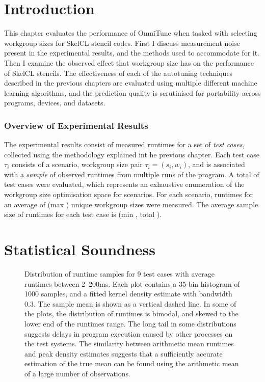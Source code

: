 \section{Introduction}

This chapter evaluates the performance of OmniTune when tasked with
selecting workgroup sizes for SkelCL stencil codes. First I discuss
measurement noise present in the experimental results, and the methods
used to accommodate for it. Then I examine the observed effect that
workgroup size has on the performance of SkelCL stencils. The
effectiveness of each of the autotuning techniques described in the
previous chapters are evaluated using multiple different machine
learning algorithms, and the prediction quality is scrutinised for
portability across programs, devices, and datasets.


\subsubsection{Overview of Experimental Results}

The experimental results consist of measured runtimes for a set of
\emph{test cases}, collected using the methodology explained int he
previous chapter. Each test case $\tau_i$ consists of a scenario,
workgroup size pair $\tau_i = (s_i,w_i)$, and is associated with a
\emph{sample} of observed runtimes from multiple runs of the
program. A total of  test cases were
evaluated, which represents an exhaustive enumeration of the workgroup
size optimisation space for  scenarios. For
each scenario, runtimes for an average of 
(max ) unique workgroup sizes were
measured. The average sample size of runtimes for each test case is
 (min , total
).


\section{Statistical Soundness}

\begin{figure}

\caption{%
  Distribution of runtime samples for 9 test cases with average
  runtimes between 2--200ms. Each plot contains a 35-bin histogram of
  1000 samples, and a fitted kernel density estimate with bandwidth
  0.3. The sample mean is shown as a vertical dashed line. In some of
  the plots, the distribution of runtimes is bimodal, and skewed to
  the lower end of the runtimes range. The long tail in some
  distributions suggests delays in program execution caused by other
  processes on the test systems. The similarity between arithmetic
  mean runtimes and peak density estimates suggests that a
  sufficiently accurate estimation of the true mean can be found using
  the arithmetic mean of a large number of observations.%
}
\label{fig:runtime-histograms}
\end{figure}

